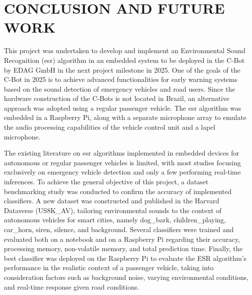 \chapter{CONCLUSION AND FUTURE WORK}
\label{chp:conclusion}

This project was undertaken to develop and implement an Environmental Sound Recognition (\gls{esr}) algorithm in an embedded system to be deployed in the C-Bot by EDAG GmbH in the next project milestone in 2025. One of the goals of the C-Bot in 2025 is to achieve advanced functionalities for early warning systems based on the sound detection of emergency vehicles and road users. Since the hardware construction of the C-Bots is not located in Brazil, an alternative approach was adopted using a regular passenger vehicle. The \gls{esr} algorithm was embedded in a Raspberry Pi, along with a separate microphone array to emulate the audio processing capabilities of the vehicle control unit and a lapel microphone.

The existing literature on \gls{esr} algorithms implemented in embedded devices for autonomous or regular passenger vehicles is limited, with most studies focusing exclusively on emergency vehicle detection and only a few performing real-time inferences. To achieve the general objective of this project, a dataset benchmarking study was conducted to confirm the accuracy of implemented classifiers. A new dataset was constructed and published in the Harvard Dataverse (US8K\_AV), tailoring environmental sounds to the context of autonomous vehicles for smart cities, namely dog\_bark, children\_playing, car\_horn, siren, silence, and background. Several classifiers were trained and evaluated both on a notebook and on a Raspberry Pi regarding their accuracy, processing memory, non-volatile memory, and total prediction time. Finally, the best classifier was deployed on the Raspberry Pi to evaluate the ESR algorithm's performance in the realistic context of a passenger vehicle, taking into consideration factors such as background noise, varying environmental conditions, and real-time response given road conditions.



